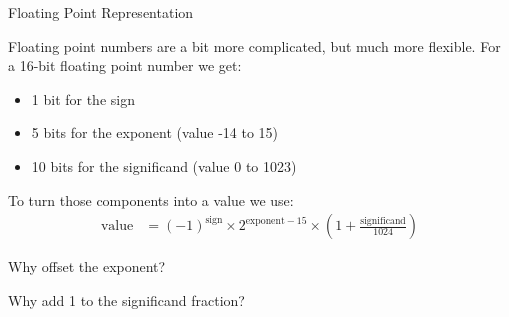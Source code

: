 \begin{frame}{Floating Point Representation}

    Floating point numbers are a bit more complicated, but much more flexible. For
    a 16-bit floating point number we get:

    \begin{itemize}
        \item 1 bit for the sign
        \item 5 bits for the exponent (value -14 to 15)
        \item 10 bits for the significand (value 0 to 1023)
    \end{itemize}

    To turn those components into a value we use:
    \begin{align*}
        \text{value} & = (-1)^{\text{sign}} \times 2^{\text{exponent} - 15} \times \left(1 + \frac{\text{significand}}{1024} \right)
    \end{align*}

    Why offset the exponent?

    Why add 1 to the significand fraction?

\end{frame}


